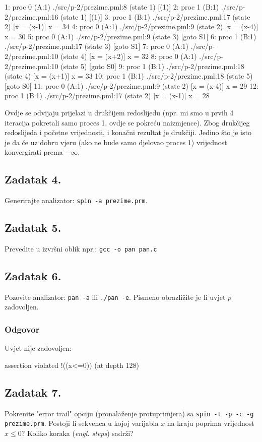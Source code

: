 \documentclass{article}
\newcommand{\zadatak}[1]{\subsection{Zadatak #1}}
\newcommand{\odgovor}{\subsubsection*{Odgovor}}
\begin{document}
\begin{ccode}
  1:    proc  0 (A:1) ./src/p-2/prezime.pml:8 (state 1)  [(1)]
  2:    proc  1 (B:1) ./src/p-2/prezime.pml:16 (state 1) [(1)]
  3:    proc  1 (B:1) ./src/p-2/prezime.pml:17 (state 2) [x = (x-1)]
                x = 34
  4:    proc  0 (A:1) ./src/p-2/prezime.pml:9 (state 2)  [x = (x-4)]
                x = 30
  5:    proc  0 (A:1) ./src/p-2/prezime.pml:9 (state 3)  [goto S1]
  6:    proc  1 (B:1) ./src/p-2/prezime.pml:17 (state 3) [goto S1]
  7:    proc  0 (A:1) ./src/p-2/prezime.pml:10 (state 4) [x = (x+2)]
                x = 32
  8:    proc  0 (A:1) ./src/p-2/prezime.pml:10 (state 5) [goto S0]
  9:    proc  1 (B:1) ./src/p-2/prezime.pml:18 (state 4) [x = (x+1)]
                x = 33
 10:    proc  1 (B:1) ./src/p-2/prezime.pml:18 (state 5) [goto S0]
 11:    proc  0 (A:1) ./src/p-2/prezime.pml:9 (state 2)  [x = (x-4)]
                x = 29
 12:    proc  1 (B:1) ./src/p-2/prezime.pml:17 (state 2) [x = (x-1)]
                x = 28
\end{ccode} \newline

\noindent

Ovdje se odvijaju prijelazi u drukčijem redoslijedu (npr. mi smo u prvih 4 iteracija pokretali samo proces 1, ovdje se pokreću naizmjence). Zbog drukčijeg redoslijeda i početne vrijednosti, i konačni rezultat je drukčiji. Jedino što je isto je da će uz dobru vjeru (ako ne bude samo djelovao proces 1) vrijednost konvergirati prema $-\infty$.


\zadatak{4.}

Generirajte analizator: \texttt{spin -a prezime.prm}.


\zadatak{5.}

Prevedite u izvršni oblik npr.: \texttt{gcc -o pan pan.c}


\zadatak{6.}

Pozovite analizator: \texttt{pan -a} ili \texttt{./pan -e}. Pismeno obrazližite je li uvjet $p$ zadovoljen.

\odgovor

Uvjet nije zadovoljen:

\begin{ccode}
assertion violated  !((x<=0)) (at depth 128)
\end{ccode}


\zadatak{7.}

Pokrenite "error trail" opciju (pronalaženje protuprimjera) sa \texttt{spin -t -p -c -g prezime.prm}. Postoji li sekvenca u kojoj varijabla $x$ na kraju poprima vrijednost $x \leq 0$? Koliko koraka (\textit{engl. steps}) sadrži?
\end{document}
